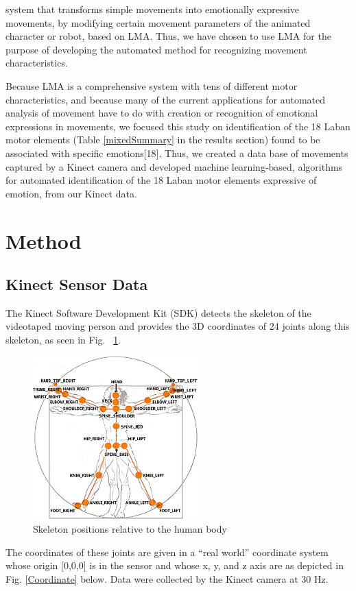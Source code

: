 \cite{masuda2010motion}  system that transforms simple movements into
emotionally expressive movements, by modifying certain movement parameters of
the animated character or robot, based on LMA. Thus, we have chosen to use LMA
for the purpose of developing the automated method for recognizing movement
characteristics.
\par Because LMA is a comprehensive system with tens of different motor
characteristics, and because many of the current applications for automated
analysis of movement have to do with creation or recognition of emotional
expressions in movements, we  focused this study on identification of the 18
Laban motor elements (Table \ref{mixedSummary} in the results section)
found to be associated with specific emotions[18]. Thus, we created a data base
of movements captured by a Kinect camera and developed machine learning-based,
algorithms for automated identification of the 18 Laban motor elements
expressive of emotion, from our Kinect data.

\section{Method}
\subsection{Kinect Sensor Data}
The Kinect Software Development Kit (SDK) detects the skeleton of the videotaped
moving person and provides the 3D coordinates of 24 joints along this skeleton,
as seen in Fig. ~\ref{skeleton}.

\begin{figure}[h]
\centering
\includegraphics[width=2.5in]{graphics/Laban/skeleton.jpg}
\caption{Skeleton positions relative to the human body}
\label{skeleton}
\end{figure}

The coordinates of these joints are given in a
“real world” coordinate system whose origin [0,0,0] is in the sensor and whose
x, y, and z axis are as depicted in Fig. \ref{Coordinate} below. Data were
collected by the Kinect camera at 30 Hz.


